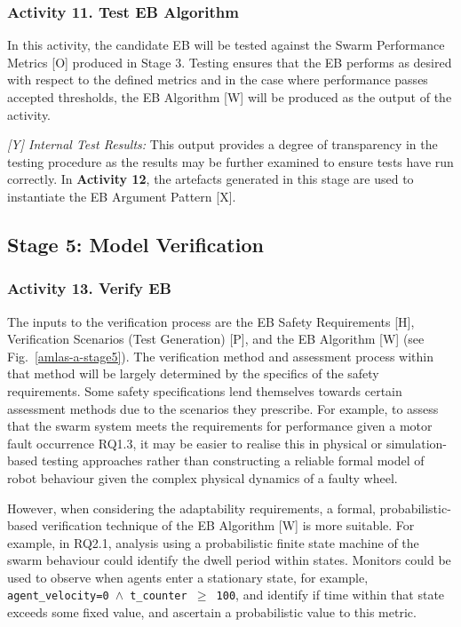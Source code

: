 \documentclass[runningheads]{llncs}
\begin{document}
\subsubsection*{Activity 11. Test EB Algorithm}

In this activity, the candidate EB will be tested against the Swarm Performance Metrics [O] produced in Stage 3. Testing ensures that the EB performs as desired with respect to the defined metrics and in the case where performance passes accepted thresholds, the EB Algorithm [W] will be produced as the output of the activity. 

\emph{[Y] Internal Test Results:} This output provides a degree of transparency in the testing procedure as the results may be further examined to ensure tests have run correctly. 
In \textbf{Activity 12}, the artefacts generated in this stage are used to instantiate the EB Argument Pattern [X].

\subsection{Stage 5: Model Verification} \label{framework-stage5}
\subsubsection*{Activity 13. Verify EB}
The inputs to the verification process are the EB Safety Requirements [H], Verification Scenarios (Test Generation) [P], and the EB Algorithm [W] (see Fig.~\ref{amlas-a-stage5}). 
%
The verification method and assessment process within that method will be largely determined by the specifics of the safety requirements. Some safety specifications lend themselves towards certain assessment methods due to the scenarios they prescribe.
%
For example, to assess that the swarm system meets the requirements for performance given a motor fault occurrence RQ1.3, it may be easier to realise this in physical or simulation-based testing approaches rather than constructing a reliable formal model of robot behaviour given the complex physical dynamics of a faulty wheel.

%
However, when considering the adaptability requirements, a formal, probabilistic-based verification technique of the EB Algorithm [W] is more suitable. For example, in RQ2.1, analysis using a probabilistic finite state machine of the swarm behaviour could identify the dwell period within states. Monitors could be used to observe when agents enter a stationary state, for example, \texttt{agent\_velocity=0 $\land $  t\_counter  $\ge$ 100}, and identify if time within that state exceeds some fixed value, and ascertain a probabilistic value to this metric.
\end{document}
